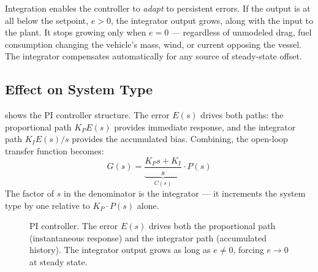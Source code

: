 \documentclass[../../book.tex]{subfiles}
\begin{document}
Integration enables the controller to \emph{adapt} to persistent errors.  If the output is at all below the
setpoint, $e > 0$, the integrator output grows, along with the input to the plant.
It stops growing only when $e = 0$ --- regardless of unmodeled drag, fuel
consumption changing the vehicle's mass, wind, or current opposing the vessel.
The integrator compensates automatically for any source of steady-state offset.


\subsection{Effect on System Type}

 shows the PI controller structure.  The error $E(s)$
drives both paths: the proportional path $K_P E(s)$ provides immediate response,
and the integrator path $K_I E(s)/s$ provides the accumulated bias.
Combining, the open-loop transfer function becomes:
\[
  G(s) = \underbrace{\frac{K_P s + K_I}{s}}_{C(s)}\cdot P(s)
\]
The factor of $s$ in the denominator is the integrator --- it increments the
system type by one relative to $K_P\cdot P(s)$ alone.

\begin{figure}[htbp]
\centering
{}
\caption{PI controller.  The error $E(s)$ drives both the proportional path
  (instantaneous response) and the integrator path (accumulated history).
  The integrator output grows as long as $e \ne 0$, forcing $e \to 0$ at
  steady state.}
\label{fig:pi_structure}
\end{figure}
\end{document}
